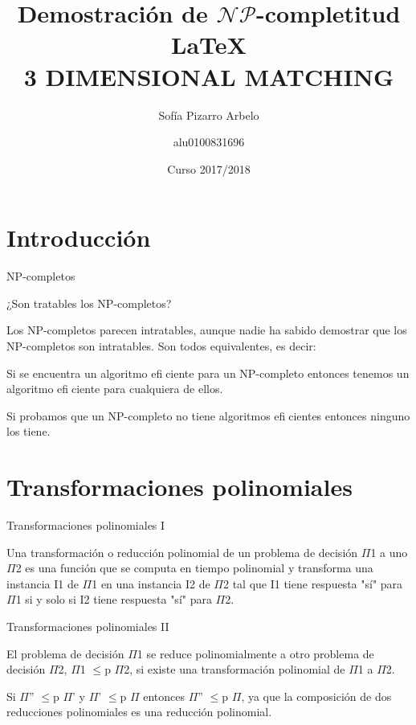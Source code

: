 \documentclass[10pt, mathserif, profesionalfont]{beamer}
\title{\Huge Demostraci\'{o}n de $\mathcal{NP}$-completitud \LaTeX \\3 DIMENSIONAL MATCHING}
\author{Sofía Pizarro Arbelo \and alu0100831696}
\institute[ULL]{Universidad de La Laguna}
\date{Curso 2017/2018}
\begin{document}
\begin{frame}
  \titlepage
\end{frame}

\section{Introducción}
\begin{frame}{NP-completos}
    
\begin{block}
{\small 
\noindent ¿Son tratables los NP-completos?

\noindent Los NP-completos parecen intratables, aunque nadie ha sabido demostrar que los NP-completos son
intratables. Son todos equivalentes, es decir:
}
\end{block}

\begin{block}
{\small
\noindent Si se encuentra un algoritmo eficiente para un NP-completo entonces tenemos un algoritmo
eficiente para cualquiera de ellos.

\noindent Si probamos que un NP-completo no tiene algoritmos eficientes entonces ninguno los tiene.
}
\end{block}


\end{frame}

\section{Transformaciones polinomiales}
\begin{frame}{Transformaciones polinomiales I}
    
\begin{block}  
 Una transformación o reducción polinomial de un problema de decisión $\Pi$1 a uno $\Pi$2 es una función que se computa en tiempo polinomial y transforma una instancia I1 de $\Pi$1 en una instancia I2 de $\Pi$2 tal que I1 tiene respuesta "sí" para $\Pi$1 si y solo si I2 tiene respuesta "sí" para $\Pi$2.  

\end{block}

\end{frame}

\begin{frame}{Transformaciones polinomiales II}
    
\begin{block}  
El problema de decisión $\Pi$1 se reduce polinomialmente a otro problema de decisión $\Pi$2, $\Pi$1 $\leq$p $\Pi$2, si existe una transformación polinomial de $\Pi$1 a $\Pi$2. 

\end{block}
\begin{block}
Si $\Pi$'' $\leq$p $\Pi$' y $\Pi$' $\leq$p $\Pi$ entonces $\Pi$'' $\leq$p $\Pi$, ya que la composición de dos reducciones polinomiales es una reducción polinomial.
\end{block}  

\end{frame}
\end{document}
